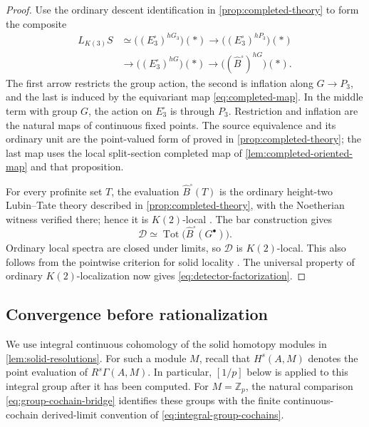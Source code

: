 \documentclass[11pt]{article}
\numberwithin{equation}{section}
\theoremstyle{definition}
\theoremstyle{remark}
\newcommand{\Z}{\mathbb Z}
\begin{document}
\begin{proof}
Use the ordinary descent identification in
\cref{prop:completed-theory} to form the composite
\begin{equation}\label{eq:detector-construction}
\begin{split}
 L_{K(3)}S
 &\simeq\bigl((E_3^{\square})^{hG_3}\bigr)(*)
 \longrightarrow\bigl((E_3^{\square})^{hP_3}\bigr)(*)\\
 &\longrightarrow\bigl((E_3^{\square})^{hG}\bigr)(*)
 \longrightarrow\bigl((\widehat B^{\square})^{hG}\bigr)(*).
\end{split}
\end{equation}
The first arrow restricts the group action, the second is inflation along
$G\to P_3$, and the last is induced by the equivariant map
\eqref{eq:completed-map}.  In the middle term with group $G$, the action on
$E_3^{\square}$ is through $P_3$. Restriction and inflation are the
natural maps of continuous fixed points. The source equivalence and its ordinary unit are the point-valued
form of \cite[Proposition~4.6.9]{BMR2026} proved in
\cref{prop:completed-theory}; the last map uses the local split-section
completed map of \cref{lem:completed-oriented-map} and that proposition.

For every profinite set $T$, the evaluation
$\widehat B^{\square}(T)$ is the ordinary height-two Lubin--Tate theory
described in \cref{prop:completed-theory}, with the Noetherian witness
verified there; hence it is $K(2)$-local
\cite[Proposition~4.4.2]{BMR2026}.
The bar construction gives
\[
 \mathcal D\simeq\operatorname{Tot}\bigl(\widehat B^{\square}(G^{\bullet})\bigr).
\]
Ordinary local spectra are closed under limits, so $\mathcal D$ is
$K(2)$-local.  This also follows from the
pointwise criterion for solid locality
\cite[Definition~4.5.7 and the following paragraph]{BMR2026}.
The universal property of ordinary $K(2)$-localization now gives
\eqref{eq:detector-factorization}.
\end{proof}

\subsection{Convergence before rationalization}

We use integral continuous cohomology of the solid homotopy modules in
\cref{lem:solid-resolutions}.  For such a module $M$, recall that
$H^s(A,M)$ denotes the point evaluation of $R^s\Gamma(A,M)$.
In particular, $[1/p]$ below is applied to this integral group after it
has been computed.  For $M=\Z_p$, the natural comparison
\eqref{eq:group-cochain-bridge} identifies these groups with the
finite continuous-cochain derived-limit convention of
\eqref{eq:integral-group-cochains}.
\end{document}
